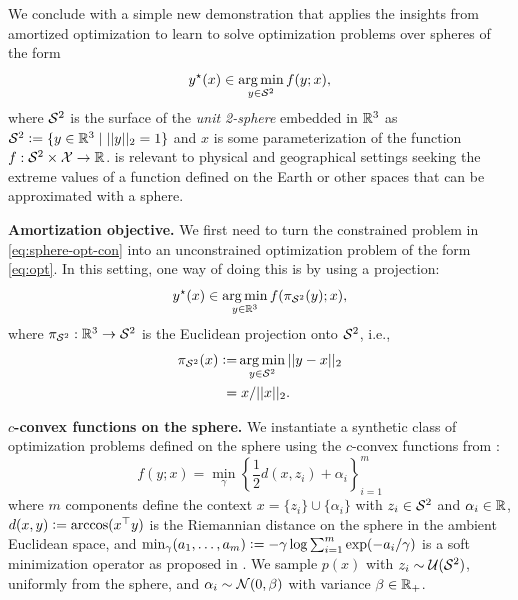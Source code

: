 \documentclass[twoside,11pt]{article}
\newcommand{\ie}{i.e.\xspace}
\begin{document}
We conclude with a simple new demonstration that applies
the insights from amortized optimization to learn to solve
optimization problems over spheres of the form
\begin{equation}
  y^\star(x) \in \operatorname*{arg\,min}_{y\in{\mathcal{S}}^2} f(y; x),
  \label{eq:sphere-opt-con}
\end{equation}
where ${\mathcal{S}}^2$ is the surface of the \emph{unit 2-sphere}
embedded in $\mathbb{R}^3$ as ${\mathcal{S}}^2\vcentcolon= \{y\in\mathbb{R}^3 \mid ||y||_2=1\}$
and $x$ is some parameterization of the function
$f: {\mathcal{S}}^2\times{\mathcal{X}}\rightarrow \mathbb{R}$.
 is relevant to physical and
geographical settings seeking the extreme values of a
function defined on the Earth or other spaces that can
be approximated with a sphere.

\textbf{Amortization objective.}
We first need to turn the constrained problem in \cref{eq:sphere-opt-con}
into an unconstrained optimization problem of the form
\cref{eq:opt}. In this setting, one way of doing this
is by using a projection:
\begin{equation}
  y^\star(x) \in \operatorname*{arg\,min}_{y\in\mathbb{R}^3} f(\pi_{{\mathcal{S}}^2}(y); x),
  \label{eq:sphere-opt-proj}
\end{equation}
where $\pi_{{\mathcal{S}}^2}: \mathbb{R}^3\rightarrow {\mathcal{S}}^2$ is the
Euclidean projection onto ${\mathcal{S}}^2$, \ie,
\begin{equation}
  \begin{aligned}
    \pi_{{\mathcal{S}}^2}(x)\vcentcolon=& \operatorname*{arg\,min}_{y\in{\mathcal{S}}^2} ||y-x||_2 \\
     =& \;x/||x||_2.
  \end{aligned}
  \label{eq:pi}
\end{equation}

\textbf{$c$-convex functions on the sphere.}
We instantiate a synthetic class of
optimization problems defined on the sphere
using the $c$-convex functions from
\citet{cohen2021riemannian}:
\begin{equation}
  f(y; x) = {\textstyle \min_{\gamma}} \left\{\frac{1}{2} d(x,z_i)+\alpha_i\right\}_{i=1}^m
  \label{eq:rcpm}
\end{equation}
where $m$ components define the context
$x=\{z_i\} \cup \{\alpha_i\}$
with $z_i\in{\mathcal{S}}^2$ and $\alpha_i\in\mathbb{R}$,
$d(x,y)\vcentcolon= \arccos(x^\top y)$ is the
Riemannian distance on the sphere in the
ambient Euclidean space, and
$\min_\gamma(a_1,\ldots,a_m)\vcentcolon= -\gamma\log\sum_{i=1}^m\exp(-a_i/\gamma)$
is a soft minimization operator
as proposed in \citet{cuturi2017soft}.
We sample $p(x)$ with $z_i\sim {\mathcal{U}}({\mathcal{S}}^2)$,
uniformly from the sphere, and
$\alpha_i\sim{\mathcal{N}}(0,\beta)$
with variance $\beta\in\mathbb{R}_+$.
\end{document}
